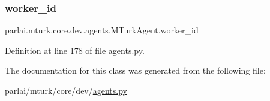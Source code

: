\subsubsection{\texorpdfstring{worker\+\_\+id}{worker\_id}}
{\footnotesize\ttfamily parlai.\+mturk.\+core.\+dev.\+agents.\+M\+Turk\+Agent.\+worker\+\_\+id}



Definition at line 178 of file agents.\+py.



The documentation for this class was generated from the following file\+:\begin{DoxyCompactItemize}
\item 
parlai/mturk/core/dev/\hyperlink{parlai_2mturk_2core_2dev_2agents_8py}{agents.\+py}\end{DoxyCompactItemize}
